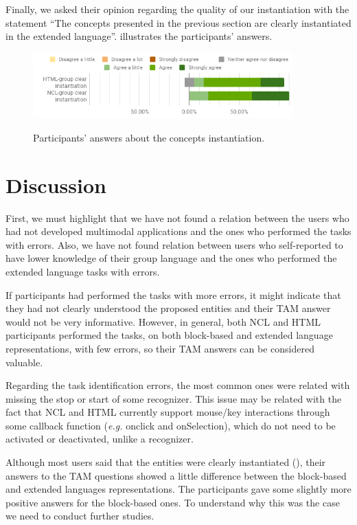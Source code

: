 Finally, we asked their opinion regarding the quality of our instantiation with
the statement “The concepts presented in the previous section are clearly
instantiated in the extended language”.  illustrates the
participants’ answers.

\begin{figure}[!ht]
\begin{center}
	\includegraphics[width=10cm, keepaspectratio]{img/img26.png}
	\caption{Participants’ answers about the concepts instantiation.}
    \captionvspace
	\label{fig:lang-res4}
\end{center}
\end{figure}

\section{Discussion}
\label{sec:evaluation:discussion}

First, we must highlight that we have not found a relation between the users who
had not developed multimodal applications and the ones who performed the tasks
with errors. Also, we have not found relation between users who self-reported to
have lower knowledge of their group language and the ones who performed the
extended language tasks with errors.

If participants had performed the tasks with more errors, it might indicate that
they had not clearly understood the proposed entities and their TAM answer would
not be very informative. However, in general, both NCL and HTML participants
performed the tasks, on both block-based and extended language representations,
with few errors, so their TAM answers can be considered valuable.

Regarding the task identification errors, the most common ones were related with
missing the stop or start of some recognizer. This issue may be related with the
fact that NCL and HTML currently support mouse/key interactions through some
callback function (\textit{e.g.} onclick and onSelection), which do not need to be
activated or deactivated, unlike a recognizer.

Although most users said that the entities were clearly instantiated
(), their answers to the TAM questions showed a little
difference between the block-based and extended languages representations. The
participants gave some slightly more positive answers for the block-based ones.
To understand why this was the case we need to conduct further studies.